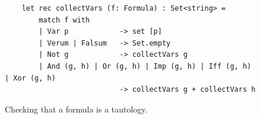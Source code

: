\begin{figure}[!ht]
  \centering
\begin{verbatim}
    let rec collectVars (f: Formula) : Set<string> =
        match f with
        | Var p            -> set [p]
        | Verum | Falsum   -> Set.empty
        | Not g            -> collectVars g
        | And (g, h) | Or (g, h) | Imp (g, h) | Iff (g, h) | Xor (g, h) 
                           -> collectVars g + collectVars h
\end{verbatim}
\vspace*{-0.3cm}
  \caption{Checking that a formula is a tautology.}
  \label{fig:tautology.py-collectVars}
\end{figure}

